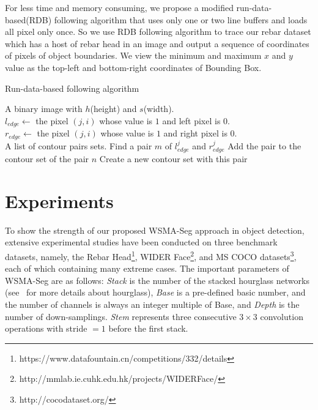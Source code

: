 \documentclass{article}
\begin{document}
{For less time and memory consuming, we propose a modified run-data-based(RDB) following algorithm that uses only one or two line buffers and loads all pixel only once\cite{agrawala1977sequential}.
So we use RDB following algorithm to trace our rebar dataset which has a host of rebar head in an image and output a sequence of coordinates of pixels of object boundaries. We view the minimum and maximum $x$ and $y$ value as the top-left and bottom-right coordinates of Bounding Box.

\begin{algorithm}
  \caption{Run-data-based following algorithm\label{rdb}}
  \begin{algorithmic}[1]
     \Require
     A binary image with $h$(height) and $s$(width).\\
     $l_{edge} \gets$ the pixel $(j,i)$ whose value is $1$ and left pixel is 0.\\
     $r_{edge} \gets$ the pixel $(j,i)$ whose value is $1$ and right pixel is 0.\\
     \Ensure
     A list of contour pairs sets.
        \State Find a pair $m$ of $l_{edge}^j$ and $r_{edge}^j$
              \State Add the pair to the contour set of the pair $n$
           \Else
              \State Create a new contour set with this pair
           \EndIf
     \EndWhile
     \EndFor
  \end{algorithmic}
\end{algorithm}







}

\section{Experiments}

To show the strength of our proposed WSMA-Seg approach in object detection, extensive experimental studies have been conducted on three benchmark datasets, namely, the Rebar Head\footnote{https://www.datafountain.cn/competitions/332/details}, WIDER Face\footnote{http://mmlab.ie.cuhk.edu.hk/projects/WIDERFace/}, and MS COCO datasets\footnote{http://cocodataset.org/}, each of which containing many extreme cases. The important parameters of WSMA-Seg are as follows: \textit{Stack} is the number of the stacked hourglass networks (see~\cite{newell2016stacked} for more details about hourglass), \textit{Base} is a pre-defined basic number, and the number of channels is always an integer  multiple of Base, and \textit{Depth} is the number of down-samplings. \textit{Stem} represents three consecutive $3\times 3$ convolution operations with stride $=1$ before the first stack.
\end{document}
